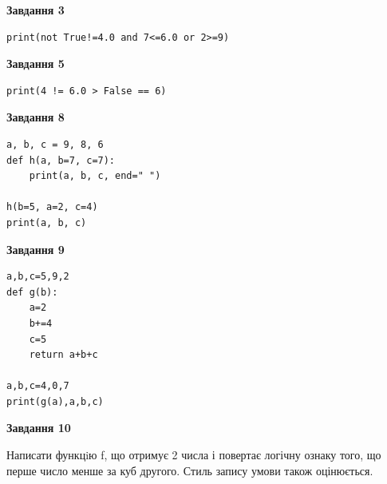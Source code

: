 \documentclass[12pt, ukrainian]{article}
\begin{document}
{\begin {large}
\begin{minipage}[t]{7.5cm}
\end{minipage}
\vline \hspace{6mm}
\begin{minipage}[t]{10.5cm}

\begin{center}
\textbf{Завдання 3}
\end{center}

\begin{verbatim}
print(not True!=4.0 and 7<=6.0 or 2>=9)
\end{verbatim}



\begin{center}
\textbf{Завдання 5}
\end{center}

\begin{verbatim}
print(4 != 6.0 > False == 6)
\end{verbatim}



\begin{center}
\textbf{Завдання 8}
\end{center}

\begin{verbatim}
a, b, c = 9, 8, 6
def h(a, b=7, c=7):
    print(a, b, c, end=" ")

h(b=5, a=2, c=4)
print(a, b, c)
\end{verbatim}



\begin{center}
\textbf{Завдання 9}
\end{center}

\begin{verbatim}
a,b,c=5,9,2
def g(b):
    a=2
    b+=4
    c=5
    return a+b+c

a,b,c=4,0,7
print(g(a),a,b,c)
\end{verbatim}



\begin{center}
\textbf{Завдання 10}
\end{center}

Написати функцiю f, що отримує 2 числа і повертає логічну ознаку того, що перше число менше за куб другого. Стиль запису умови також оцінюється.\par

\end{minipage}

\end {large}}
\newpage
\end{document}
